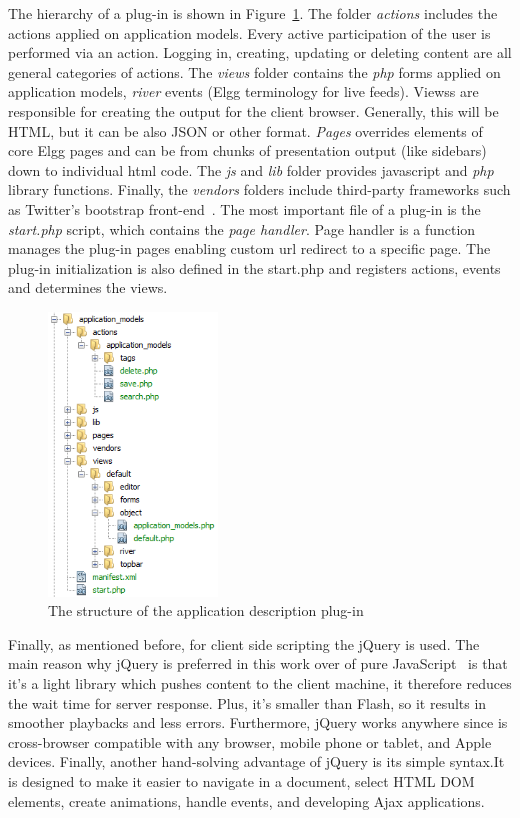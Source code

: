 The hierarchy of a plug-in is shown in Figure~\ref{fig:elgg_hierarchy}. 
The folder {\em actions} includes the actions applied on application models. Every active participation of the user is performed via an action. Logging in, creating, updating or deleting content are all general categories of actions.
The {\em views} folder contains the {\em php} forms applied on application models, {\em river} events (Elgg terminology for live feeds). Viewss are responsible for creating the output for the client browser. Generally, this will be HTML, but it can be also JSON or other format. 
{\em Pages} overrides elements of core Elgg pages and can be from chunks of presentation output (like sidebars) down to individual html code.  
The {\em js} and {\em lib} folder provides javascript and {\em php} library functions. 
Finally, the {\em vendors} folders include third-party frameworks such as Twitter's bootstrap front-end~\cite{bootstrap_url}.
The most important file of a plug-in is the \emph{start.php} script, which contains the \emph{page handler}. Page handler is a function manages the plug-in pages enabling custom url redirect to a specific page. 
The plug-in initialization is also defined in the start.php and registers actions, events and determines the views. 

\begin{figure}[h]
	\centering
	\includegraphics[width=0.4\textwidth]{./fig/folder_hierarchy.png}
	\caption{The structure of the application description plug-in}
	\label{fig:elgg_hierarchy}
\end{figure}

Finally, as mentioned before, for client side scripting the jQuery is used. The main reason why jQuery is preferred in this work over of pure JavaScript~\cite{mccormick2004jquery} is that it's a light library which pushes content to the client machine, it therefore reduces the wait time for server response. Plus, it's smaller than Flash, so it results in smoother playbacks and less errors. Furthermore, jQuery works anywhere since is cross-browser compatible with any browser, mobile phone or tablet, and Apple devices. Finally, another hand-solving advantage of jQuery is its simple syntax.It is designed to make it easier to navigate in a document, select HTML DOM elements, create animations, handle events, and developing Ajax applications. 

